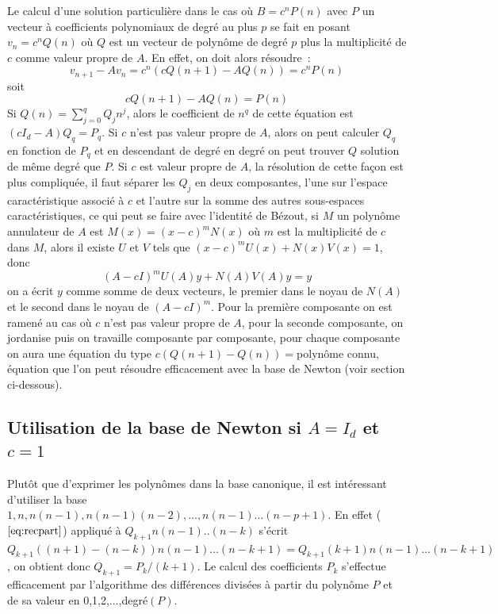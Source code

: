 \documentclass[a4paper,11pt]{book}
\begin{document}
\begin{giacjshere}
Le calcul d'une solution particulière dans le cas où 
$B=c^n P(n)$ avec $P$ un vecteur à coefficients polynomiaux
de degré au plus $p$ se fait en posant $v_n=c^n Q(n)$
où $Q$ est un vecteur de polynôme de degré $p$ plus la multiplicité
de $c$ comme valeur propre de $A$. En effet, on doit alors résoudre~:
$$v_{n+1}-Av_n = c^n (c Q(n+1)- AQ(n)) = c^n P(n)  $$
soit
\begin{equation} \label{eq:recpart}
c Q(n+1)- AQ(n) = P(n)
\end{equation}
Si $Q(n)=\sum_{j=0}^q Q_j n^j$, alors le coefficient de $n^q$ de cette équation
est $(c I_d -A)Q_q=P_q$. Si $c$ n'est pas valeur propre de $A$, alors
on peut calculer $Q_q$ en fonction de $P_q$ et en descendant de degré en degré
on peut trouver $Q$ solution de même degré que $P$. Si $c$ est valeur
propre de $A$, la résolution de cette façon
est plus compliquée, il faut séparer les
$Q_j$ en deux composantes, l'une sur l'espace caractéristique associé
à $c$ et l'autre sur la somme des autres sous-espaces caractéristiques,
ce qui peut se faire avec l'identité de Bézout, si $M$ un polynôme annulateur
de $A$ est $M(x)=(x-c)^m N(x)$ où $m$ est la multiplicité de $c$ dans $M$,
alors il existe $U$ et $V$ tels que $(x-c)^mU(x)+N(x)V(x)=1$, donc
\[ (A-cI)^m U(A)y+N(A)V(A)y= y\]
on a écrit $y$ comme somme de deux vecteurs, le premier dans le noyau de
$N(A)$ et le second dans le noyau de $(A-cI)^m$. Pour la première
composante on est ramené au cas où $c$ n'est pas valeur propre de $A$,
pour la seconde composante, on jordanise puis on travaille composante
par composante, pour chaque composante on aura une équation du type
$c(Q(n+1)-Q(n))=$polynôme connu, équation 
que l'on peut résoudre efficacement avec
la base de Newton (voir section ci-dessous).

\subsection{Utilisation de la base de Newton si $A=I_d$ et $c=1$}
Plutôt que d'exprimer les polynômes dans la base canonique, il est
intéressant d'utiliser la base $1,n,n(n-1),n(n-1)(n-2),...,n(n-1)...(n-p+1)$.
En effet (\(\ref{eq:recpart}\)) appliqué à $Q_{k+1} n(n-1)..(n-k)$ s'écrit
$Q_{k+1}((n+1)-(n-k))n(n-1)...(n-k+1)=Q_{k+1}(k+1)n(n-1)...(n-k+1)$, on obtient
donc $Q_{k+1}=P_{k}/(k+1)$. Le calcul des coefficients $P_k$ s'effectue
efficacement par l'algorithme des différences divisées à partir
du polynôme $P$ et de sa valeur en 0,1,2,...,degré$(P)$.


\end{giacjshere}
\end{document}
